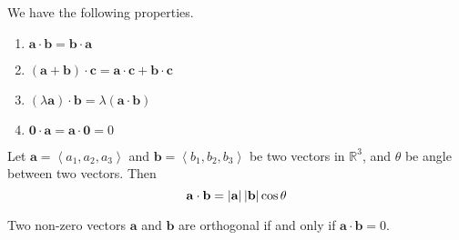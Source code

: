 \documentclass{huhtakm-template-book}
\begin{document}
\begin{lem}
    We have the following properties.
    \begin{enumerate}
        \item $\mathbf{a}\cdot\mathbf{b}=\mathbf{b}\cdot\mathbf{a}$
        \item $(\mathbf{a}+\mathbf{b})\cdot\mathbf{c}=\mathbf{a}\cdot\mathbf{c}+\mathbf{b}\cdot\mathbf{c}$
        \item $(\lambda\mathbf{a})\cdot\mathbf{b}=\lambda(\mathbf{a}\cdot\mathbf{b})$
        \item $\mathbf{0}\cdot\mathbf{a}=\mathbf{a}\cdot\mathbf{0}=0$
    \end{enumerate}
\end{lem}
\begin{thm}
    Let $\mathbf{a}=\left<a_{1},a_{2},a_{3}\right>$ and $\mathbf{b}=\left<b_{1},b_{2},b_{3}\right>$ be two vectors in $\mathbb{R}^{3}$, and $\theta$ be angle between two vectors. Then
    \begin{equation*}
        \mathbf{a}\cdot\mathbf{b}=\left|{\mathbf{a}}\right|\left|{\mathbf{b}}\right|\cos\theta
    \end{equation*}
\end{thm}
\begin{cor}
    Two non-zero vectors $\mathbf{a}$ and $\mathbf{b}$ are orthogonal if and only if $\mathbf{a}\cdot\mathbf{b}=0$.
\end{cor}
\end{document}
